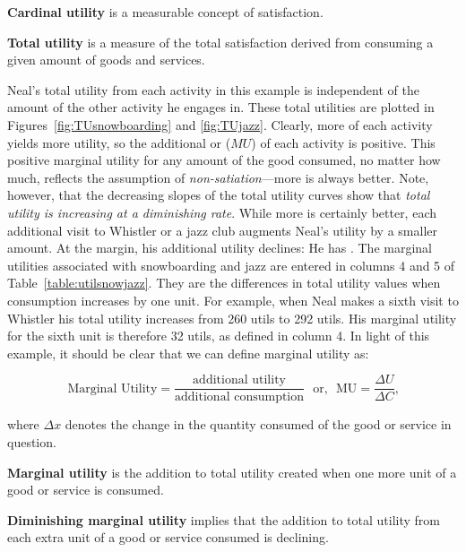 \begin{DefBox}
	\textbf{Cardinal utility} is a measurable concept of satisfaction.
	
	\textbf{Total utility} is a measure of the total satisfaction derived from consuming a given amount of goods and services.
\end{DefBox}

\newhtmlpage

Neal's total utility from each activity in this example is independent of
the amount of the other activity he engages in. These total utilities are
plotted in Figures~\ref{fig:TUsnowboarding} and \ref{fig:TUjazz}.
Clearly, more of each activity yields more utility, so the additional or %
 ($MU$) of each activity is positive. This
positive marginal utility for any amount of the good consumed, no matter how
much, reflects the assumption of \textit{non-satiation}---more is always
better. Note, however, that the decreasing slopes of the total utility
curves show that \textit{total utility is increasing at a diminishing rate}.
While more is certainly better, each additional visit to Whistler or a jazz
club augments Neal's utility by a smaller amount. At the margin, his
additional utility declines: He has . 
The marginal utilities associated with snowboarding and jazz are
entered in columns 4 and 5 of Table~\ref{table:utilsnowjazz}. They are the
differences in total utility values when consumption increases by one unit.
For example, when Neal makes a sixth visit to Whistler his total utility
increases from 260 utils to 292 utils. His marginal utility for the sixth
unit is therefore 32 utils, as defined in column 4. In light of this
example, it should be clear that we can define marginal utility as:

\begin{equation}\label{eq:marginalutility}
	\mbox{Marginal Utility} = \frac{\mbox{additional utility}}{\mbox{additional consumption}} \mbox{~~or,~~} \mbox{MU} = \frac{\Delta U}{\Delta C}\mbox{,}
\end{equation}

where $\Delta x$ denotes the change in the quantity consumed of the good or
service in question.

\begin{DefBox}
	\textbf{Marginal utility} is the addition to total utility created when one more unit of a good or service is consumed.
	
	\textbf{Diminishing marginal utility} implies that the addition to total utility from each extra unit of a good or service consumed is declining.
\end{DefBox}

